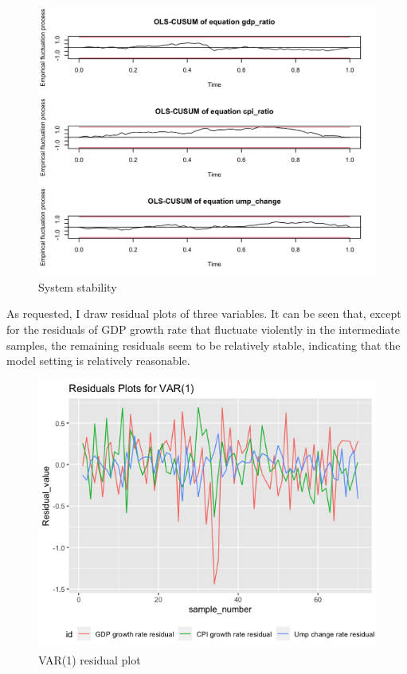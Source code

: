 \documentclass{report}
\begin{document}
\begin{figure}[H] 
\centering
\includegraphics[width=1\textwidth]{var_stab} 
\caption{ System stability} 
\label{Fig.stab}
\end{figure}

As requested, I draw residual plots of three variables. It can be seen that, except for the residuals of GDP growth rate that fluctuate violently in the intermediate samples, the remaining residuals seem to be relatively stable, indicating that the model setting is relatively reasonable.

\begin{figure}[H] 
\centering
\includegraphics[width=1\textwidth]{var_residual} 
\caption{VAR(1) residual plot} 
\label{Fig.residual}
\end{figure}
\end{document}
